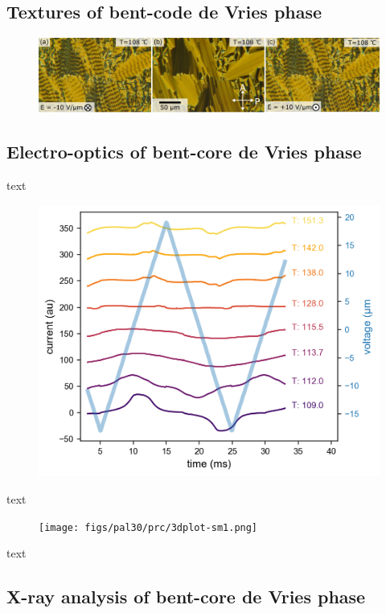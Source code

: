 \documentclass[aagreenthesis]{subfiles}
\begin{document}
\subsection{Textures of bent-code de Vries phase}


\begin{figure}[h!]
    \centering
    \includegraphics[width=.8\textwidth]{figs/pal30/textureSM2/sm1Textures100.png}
    \caption{\label{}}
\end{figure}


\subsection{Electro-optics of bent-core de Vries phase}
text
\begin{figure}[h!]
    \centering
    \includegraphics[width=.8\textwidth]{figs/pal30/prc/spacedSm1PRC.png}
    \caption{\label{}}
\end{figure}
text

\begin{figure}[h!]
    \centering
    \texttt{[image: figs/pal30/prc/3dplot-sm1.png]}
    \caption{\label{}}
\end{figure}
text

\subsection{X-ray analysis of bent-core de Vries phase}
\end{document}
